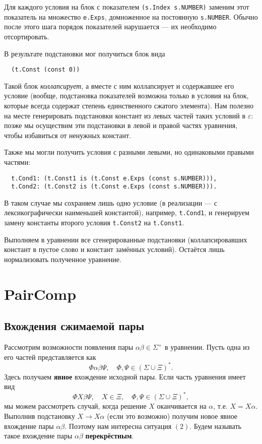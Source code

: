 \documentclass[12pt]{article}
\begin{document}
Для каждого условия на блок с показателем \texttt{(s.Index s.NUMBER)} заменим 
этот показатель на множество \texttt{e.Exps}, домноженное на постоянную
\texttt{s.NUMBER}. Обычно после этого шага порядок показателей нарушается ---
их необходимо отсортировать.

В результате подстановки мог получиться блок вида
\begin{Verbatim}
  (t.Const (const 0))
\end{Verbatim}
Такой блок \textit{коллапсирует}, а вместе с ним коллапсирует и содержавшее
его условие (вообще, подстановка показателей возможна только в условия на блок,
которые всегда содержат степень единственного сжатого элемента). Нам полезно
на месте генерировать подстановки констант из левых частей таких условий в
$\varepsilon$: позже мы осуществим эти подстановки в левой и правой частях
уравнения, чтобы избавиться от ненужных констант.

Также мы могли получить условия с разными левыми, но одинаковыми правыми
частями:
\begin{Verbatim}
  t.Cond1: (t.Const1 is (t.Const e.Exps (const s.NUMBER))),
  t.Cond2: (t.Const2 is (t.Const e.Exps (const s.NUMBER))).
\end{Verbatim}
В таком случае мы сохраняем лишь одно условие (в реализации --- с
лексикографически наименьшей константой), например, \texttt{t.Cond1}, и
генерируем замену константы второго условия \texttt{t.Const2} на
\texttt{t.Const1}.

Выполняем в уравнении все сгенерированные подстановки (коллапсировавших
констант в пустое слово и констант замённых условий). Остаётся лишь
нормализовать полученное уравнение.

\section{PairComp}

\subsection{Вхождения сжимаемой пары}

Рассмотрим возможности появления пары $\alpha \beta \in \Sigma^+ $ в
уравнении. Пусть одна из его частей представляется как 
\begin{equation}
  \Phi \alpha \beta \Psi, \quad \Phi, \Psi \in (\Sigma \cup \Xi)^*.
\end{equation}
Здесь получаем \textbf{явное} вхождение исходной пары. Если часть уравнения
имеет вид
\begin{equation}
  \Phi X \beta \Psi, \quad X \in \Xi, \quad \Phi, \Psi \in (\Sigma \cup \Xi)^*,
\end{equation}
мы можем рассмотреть случай, когда решение $X$ оканчивается на $\alpha$, т.е.
$X = X\alpha$. Выполнив подстановку $X \to X\alpha$ (если это возможно)
получим новое явное вхождение пары $\alpha \beta$. Поэтому нам интересна
ситуация $(2)$. Будем называть такое вхождение пары $\alpha \beta$
\textbf{перекрёстным}.
\end{document}
